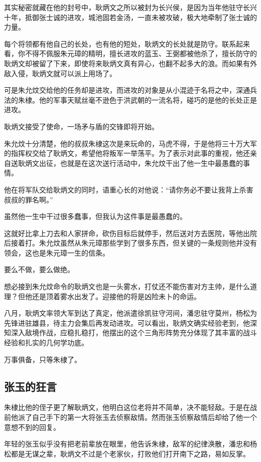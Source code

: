 \begin{multicols}{\theparacolNo}
		其实秘密就藏在他的封号中，耿炳文之所以被封为长兴侯，是因为当年他驻守长兴十年，抵御张士诚的进攻，城池固若金汤，一直未被攻破，极大地牵制了张士诚的力量。

		每个将领都有他自己的长处，也有他的短处，耿炳文的长处就是防守。联系起来看，你不得不佩服朱元璋的精明，擅长进攻的蓝玉、王弼都被他杀了，擅长防守的耿炳文却被留了下来，即使将来耿炳文真有异心，也翻不起多大的浪。而如果有外敌入侵，耿炳文就可以派上用场了。

		可是朱允炆交给他的任务却是进攻，而进攻的对象是从小混迹于名将之中，深通兵法的朱棣。他的军事天赋丝毫不逊色于洪武朝的一流名将，碰巧的是他的长处正是进攻。

		耿炳文接受了使命，一场矛与盾的交锋即将开始。

		朱允炆十分清楚，他的叔叔朱棣这次是来玩命的，马虎不得，于是他将三十万大军的指挥权交给了耿炳文，希望他将叛军一举荡平。为了表示对此事的重视，他还亲自送耿炳文出征，也就是在这次送行活动中，朱允炆干出了他一生中最愚蠢的事情。

		他在将军队交给耿炳文的同时，语重心长的对他说：“请你务必不要让我背上杀害叔叔的罪名啊。”

		虽然他一生中干过很多蠢事，但我认为这件事是最愚蠢的。

		这就好比拿上刀去和人家拼命，砍伤目标后就停手，然后送对方去医院，等他出院后接着打。朱允炆虽然从朱元璋那些学到了很多东西，但关键的一条规则他并没有领会，这也是朱元璋一生的信条。

		要么不做，要么做绝。

		想必接到朱允炆命令的耿炳文也是一头雾水，打仗还不能伤害对方主帅，是什么道理？但他还是顶着雾水出发了。迎接他的将是凶险未卜的命运。

		八月，耿炳文率领大军到达了真定，他派遣徐凯驻守河间，潘忠驻守莫州，杨松为先锋进驻雄县，待主力会集后再发动进攻。可以看出，耿炳文确实经验老到，他深知深入敌境作战，应稳扎稳打，他摆出的这个三角形阵势充分体现了其丰富的战斗经验和扎实的几何学功底。

		万事俱备，只等朱棣了。

		\subsection{张玉的狂言}
		朱棣比他的侄子更了解耿炳文，他明白这位老将并不简单，决不能轻敌。于是在战前他派了自己手下的第一大将张玉去侦察敌情。然而张玉侦察敌情后却给了他一个意想不到的回复。

		年轻的张玉似乎没有把老前辈放在眼里，他告诉朱棣，敌军的纪律涣散，潘忠和杨松都是无谋之辈，耿炳文不过是个老家伙，打败他们打开南下之路，易如反掌。


\end{multicols}
